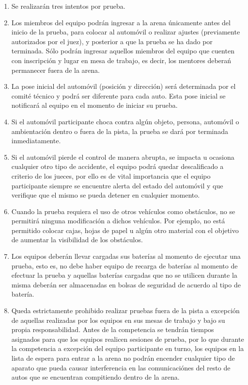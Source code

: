 \documentclass[letterpaper,12pt]{article}
\begin{document}
\begin{enumerate}
\item Se realizarán tres intentos por prueba. 

\item Los miembros del equipo podrán ingresar a la arena únicamente antes del inicio de la prueba, para colocar al automóvil o realizar ajustes (previamente autorizados por el juez), y posterior a que la prueba se ha dado por terminada. Sólo podrán ingresar aquellos miembros del equipo que cuenten con inscripción y lugar en mesa de trabajo, es decir, los mentores deberań permanecer fuera de la arena.

\item La pose inicial del automóvil (posición y dirección) será determinada por el comité técnico y podrá ser diferente para cada auto. Esta pose inicial se notificará al equipo en el momento de iniciar su prueba.

\item Si el automóvil participante choca contra algún objeto, persona, automóvil o ambientación dentro o fuera de la pista, la prueba se dará por terminada inmediatamente.

\item Si el automóvil pierde el control de manera abrupta, se impacta u ocasiona cualquier otro tipo de accidente, el equipo podrá quedar descalificado a criterio de los jueces, por ello es de vital importancia que el equipo participante siempre se encuentre alerta del estado del automóvil y que verifique que el mismo se pueda detener en cualquier momento.

\item Cuando la prueba requiera el uso de otros vehículos como obstáculos, no se permitirá ninguna modificación a dichos vehículos. Por ejemplo, no está permitido colocar cajas, hojas de papel u algún otro material con el objetivo de aumentar la visibilidad de los obstáculos. 

\item Los equipos deberán llevar cargadas sus baterías al momento de ejecutar una prueba, esto es, no debe haber equipo de recarga de baterías al momento de efectuar la prueba y aquellas baterías cargadas que no se utilicen durante la misma deberán ser almacenadas en bolsas de seguridad de acuerdo al tipo de batería.

\item Queda estrictamente prohibido realizar pruebas fuera de la pista a excepción de aquellas realizadas por los equipos en sus mesas de trabajo y bajo su propia responsabilidad. Antes de la competencia se tendrán tiempos asignados para que los equipos realicen sesiones de prueba, por lo que durante la competencia a excepción del equipo participante en turno, los equipos en la lista de espera para entrar a la arena no podrán encender cualquier tipo de aparato que pueda causar interferencia en las comunicaciónes del resto de autos que se encuentran compitiendo dentro de la arena.
\end{enumerate}
\end{document}

